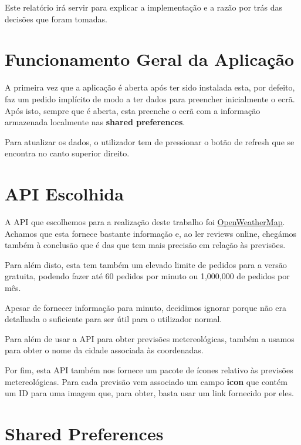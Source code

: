 \documentclass[11pt]{article}
\begin{document}
	Este relatório irá servir para explicar a implementação e a razão por trás das decisões que foram tomadas.
	
	
	\large
	\section{Funcionamento Geral da Aplicação}
	\normalsize
	
	A primeira vez que a aplicação é aberta após ter sido instalada esta, por defeito, faz um pedido implícito de modo a ter dados para preencher inicialmente o ecrã. Após isto, sempre que é aberta, esta preenche o ecrã com a informação armazenada localmente nas \textbf{shared preferences}.
	
	Para atualizar os dados, o utilizador tem de pressionar o botão de refresh que se encontra no canto superior direito.
	
	
	\large
	\section{API Escolhida}
	\normalsize
	
	A API que escolhemos para a realização deste trabalho foi \color{blue}\underline{\href{https://openweathermap.org/}{OpenWeatherMap}}\color{black}. Achamos que esta fornece bastante informação e, ao ler reviews online, chegámos também à conclusão que é das que tem mais precisão em relação às previsões.
	
	Para além disto, esta tem também um elevado limite de pedidos para a versão gratuita, podendo fazer até 60 pedidos por minuto ou 1,000,000 de pedidos por mês.
	
	Apesar de fornecer informação para minuto, decidimos ignorar porque não era detalhada o suficiente para ser útil para o utilizador normal.
	
	Para além de usar a API para obter previsões metereológicas, também a usamos para obter o nome da cidade associada às coordenadas.
	
	Por fim, esta API também nos fornece um pacote de ícones relativo às previsões metereológicas. Para cada previsão vem associado um campo \textbf{icon} que contém um ID para uma imagem que, para obter, basta usar um link fornecido por eles.
	
	
	\large
	\section{Shared Preferences}
	\normalsize
	
\end{document}
